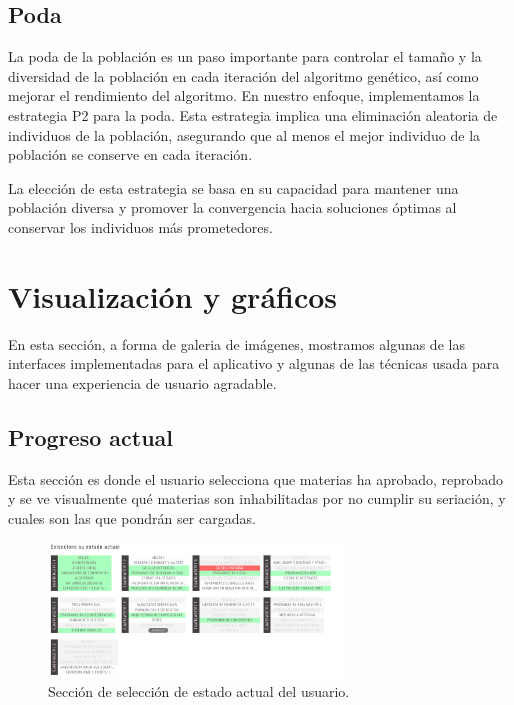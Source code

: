 \subsection{Poda} \label{poda}

La poda de la población es un paso importante para controlar el tamaño y la diversidad de la población en cada iteración del algoritmo genético, así como mejorar el rendimiento del algoritmo. En nuestro enfoque, implementamos la estrategia P2 para la poda. Esta estrategia implica una eliminación aleatoria de individuos de la población, asegurando que al menos el mejor individuo de la población se conserve en cada iteración. 

La elección de esta estrategia se basa en su capacidad para mantener una población diversa y promover la convergencia hacia soluciones óptimas al conservar los individuos más prometedores.


\section{Visualización y gráficos} \label{visualizacion_y_graficos}
En esta sección, a forma de galeria de imágenes, mostramos algunas de las interfaces implementadas para el aplicativo y algunas de las técnicas usada para hacer una experiencia de usuario agradable.

\subsection{Progreso actual} \label{progreso_actual}
Esta sección es donde el usuario selecciona que materias ha aprobado, reprobado y se ve visualmente qué materias son inhabilitadas por no cumplir su seriación, y cuales son las que pondrán ser cargadas.

\begin{figure}[h]
    \centering
    \includegraphics[width=0.7\textwidth]{images/current_status_real.png}
    \caption{Sección de selección de estado actual del usuario.}
    \label{fig:seccion_de_seleccion_de_estado_actual_del_usuario}
\end{figure}

